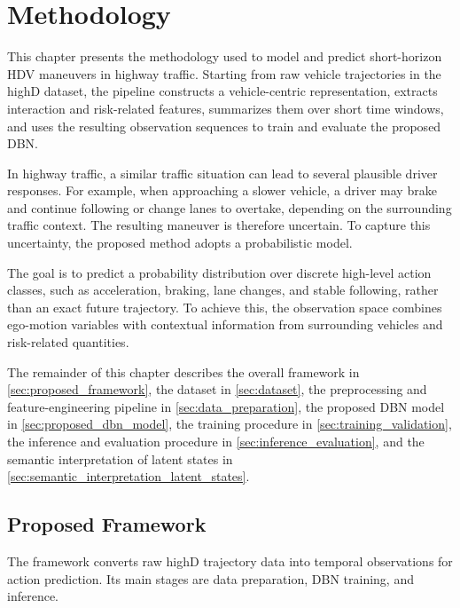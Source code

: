 \chapter{Methodology}
\label{chap:methodology}

This chapter presents the methodology used to model and predict short-horizon \ac{HDV} maneuvers in highway traffic. 
Starting from raw vehicle trajectories in the highD dataset, the pipeline constructs a vehicle-centric representation, 
extracts interaction and risk-related features, summarizes them over short time windows, and uses the resulting observation sequences 
to train and evaluate the proposed \ac{DBN}.

\par In highway traffic, a similar traffic situation can lead to several plausible driver responses. 
For example, when approaching a slower vehicle, a driver may brake and continue following or change lanes to overtake, depending on the surrounding traffic context. 
The resulting maneuver is therefore uncertain. To capture this uncertainty, the proposed method adopts a probabilistic model.

\par The goal is to predict a probability distribution over discrete high-level action classes, such as acceleration, braking, lane changes, and stable following, rather than an exact future trajectory.   
To achieve this, the observation space combines ego-motion variables with contextual information from 
surrounding vehicles and risk-related quantities.

\par The remainder of this chapter describes the overall framework in \autoref{sec:proposed_framework}, 
the dataset in \autoref{sec:dataset}, the preprocessing and feature-engineering pipeline in \autoref{sec:data_preparation}, 
the proposed \ac{DBN} model in \autoref{sec:proposed_dbn_model}, the training procedure in \autoref{sec:training_validation},  
the inference and evaluation procedure in \autoref{sec:inference_evaluation}, 
and the semantic interpretation of latent states in \autoref{sec:semantic_interpretation_latent_states}.


\section{Proposed Framework}
\label{sec:proposed_framework}

The framework converts raw highD trajectory data into temporal observations for action prediction.
Its main stages are data preparation, \ac{DBN} training, and inference.

